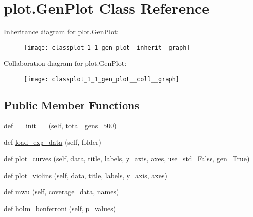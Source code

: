 \hypertarget{classplot_1_1_gen_plot}{}\section{plot.\+Gen\+Plot Class Reference}
\label{classplot_1_1_gen_plot}


Inheritance diagram for plot.\+Gen\+Plot\+:
\nopagebreak
\begin{figure}[H]
\begin{center}
\leavevmode
\texttt{[image: classplot\_1\_1\_gen\_plot\_\_inherit\_\_graph]}
\end{center}
\end{figure}


Collaboration diagram for plot.\+Gen\+Plot\+:
\nopagebreak
\begin{figure}[H]
\begin{center}
\leavevmode
\texttt{[image: classplot\_1\_1\_gen\_plot\_\_coll\_\_graph]}
\end{center}
\end{figure}
\subsection*{Public Member Functions}
\begin{DoxyCompactItemize}
\item 
def \hyperlink{classplot_1_1_gen_plot_a0abc28cd70bf5e20a3727485edf27bd6}{\+\_\+\+\_\+init\+\_\+\+\_\+} (self, \hyperlink{classplot_1_1_gen_plot_aaae1c543dd09acbbf7f509d5ad6bc73c}{total\+\_\+gens}=500)
\item 
def \hyperlink{classplot_1_1_gen_plot_a6089783223ac1a5d2c17c1040342d9d8}{load\+\_\+exp\+\_\+data} (self, folder)
\item 
def \hyperlink{classplot_1_1_gen_plot_a3d9d7fb8df32d78d395bb809ba5543c8}{plot\+\_\+curves} (self, data, \hyperlink{namespaceplot_a510b71690609bcc71ced700548e41d9b}{title}, \hyperlink{namespaceplot_ab032e615e4066fa76e9f5076554291d5}{labels}, \hyperlink{namespaceplot_ada2789a07693a357434a610f6dd9bbd2}{y\+\_\+axis}, \hyperlink{namespaceplot_a061a30323ef25d1e33063970ee69b9c5}{axes}, \hyperlink{namespaceplot_a540837c6df4283b87730e2a21178b7da}{use\+\_\+std}=False, \hyperlink{namespaceplot_a1a657d42091f30a95dc7205dca944fe9}{gen}=\hyperlink{namespaceplot_a6d72802b3442c0fab73f4958144e3251}{True})
\item 
def \hyperlink{classplot_1_1_gen_plot_a2c053b75271386a308edcdf47dc8b246}{plot\+\_\+violins} (self, data, \hyperlink{namespaceplot_a510b71690609bcc71ced700548e41d9b}{title}, \hyperlink{namespaceplot_ab032e615e4066fa76e9f5076554291d5}{labels}, \hyperlink{namespaceplot_ada2789a07693a357434a610f6dd9bbd2}{y\+\_\+axis}, \hyperlink{namespaceplot_a061a30323ef25d1e33063970ee69b9c5}{axes})
\item 
def \hyperlink{classplot_1_1_gen_plot_a3f524d008b73f561ceba494098f54a8d}{mwu} (self, coverage\+\_\+data, names)
\item 
def \hyperlink{classplot_1_1_gen_plot_a7ac98998283193af1421b28f29b9e08a}{holm\+\_\+bonferroni} (self, p\+\_\+values)
\end{DoxyCompactItemize}
